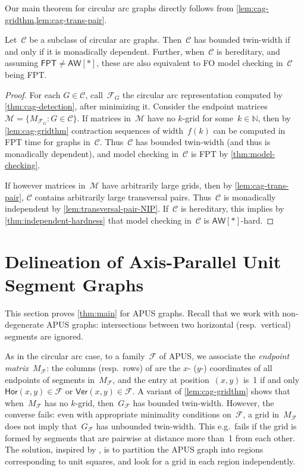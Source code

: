 \documentclass[a4paper,UKenglish,cleveref,thm-restate]{lipics-v2021}
\theoremstyle{remark}
\newcommand{\Fc}{\mathcal{F}}
\newcommand{\Cc}{\mathcal{C}}
\newcommand{\Mc}{\mathcal{M}}
\newcommand{\N}{\mathbb{N}}
\newcommand{\fpt}{\ensuremath{\mathsf{FPT}}\xspace}
\newcommand{\aw}{\ensuremath{\mathsf{AW}[*]}\xspace}
\newcommand{\Vseg}{\mathsf{Ver}}
\newcommand{\Hseg}{\mathsf{Hor}}
\begin{document}
Our main theorem for circular arc graphs directly follows from \cref{lem:cag-gridthm,lem:cag-trans-pair}.
\begin{theorem} \label{thm:delineation_circular_arc}
    Let~$\Cc$ be a subclass of circular arc graphs.
    Then~$\Cc$ has bounded twin-width if and only if it is monadically dependent.
    Further, when~$\Cc$ is hereditary, and assuming $\fpt \neq \aw$, these are also equivalent to
    FO model checking in~$\Cc$ being FPT.
\end{theorem}
\begin{proof}
    For each $G \in \Cc$, call~$\Fc_G$ the circular arc representation computed by \cref{thm:cag-detection}, after minimizing it.
    Consider the endpoint matrices $\Mc = \{M_{\Fc_G} : G \in \Cc\}$.
    If matrices in~$\Mc$ have no $k$-grid for some~$k \in \N$, then by \cref{lem:cag-gridthm} contraction sequences of width~$f(k)$ can be computed in FPT time for graphs in~$\Cc$.
    Thus~$\Cc$ has bounded twin-width (and thus is monadically dependent), and model checking in~$\Cc$ is FPT by \cref{thm:model-checking}.

    If however matrices in~$\Mc$ have arbitrarily large grids, then by \cref{lem:cag-trans-pair}, $\Cc$ contains arbitrarily large transversal pairs.
    Thus~$\Cc$ is monadically independent by \cref{lem:transversal-pair-NIP}.
    If~$\Cc$ is hereditary, this implies by \cref{thm:independent-hardness} that model checking in~$\Cc$ is \aw-hard.
\end{proof}


\section{Delineation of Axis-Parallel Unit Segment Graphs}
\label{sec:apus}
This section proves \cref{thm:main} for APUS graphs.
Recall that we work with non-degenerate APUS graphs: intersections between two horizontal (resp.\ vertical) segments are ignored.

As in the circular arc case, to a family~$\Fc$ of APUS, we associate the \emph{endpoint matrix}~$M_\Fc$:
the columns (resp.\ rows) of are the $x$- ($y$-) coordinates of all endpoints of segments in~$M_\Fc$,
and the entry at position~$(x,y)$ is~1 if and only $\Hseg(x,y) \in \Fc$ or $\Vseg(x,y) \in \Fc$.
A variant of \cref{lem:cag-gridthm} shows that when~$M_\Fc$ has no $k$-grid, then~$G_\Fc$ has bounded twin-width.
However, the converse fails: even with appropriate minimality conditions on~$\Fc$, a grid in~$M_\Fc$ does not imply that~$G_\Fc$ has unbounded twin-width.
This e.g.\ fails if the grid is formed by segments that are pairwise at distance more than~1 from each other.
The solution, inspired by \cite[Lemma~56]{bonnet2022delineation}, is to partition the APUS graph into regions corresponding to unit squares, and look for a grid in each region independently.
\end{document}

